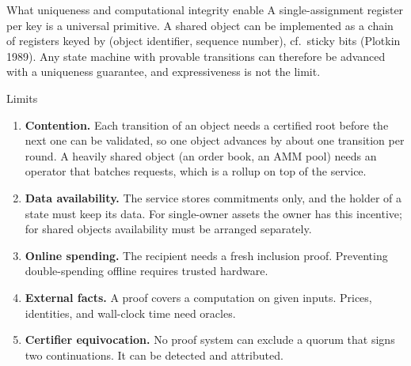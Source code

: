 \documentclass[aspectratio=169,10pt]{beamer}
\begin{document}
\begin{frame}{What uniqueness and computational integrity enable}
\footnotesize
A single-assignment register per key is a universal primitive. A shared object can be implemented as a chain of registers keyed by (object identifier, sequence number), cf.\ sticky bits (Plotkin 1989). Any state machine with provable transitions can therefore be advanced with a uniqueness guarantee, and expressiveness is not the limit.

\begin{block}{Limits}
\footnotesize
\begin{enumerate}
  \item \textbf{Contention.} Each transition of an object needs a certified root before the next one can be validated, so one object advances by about one transition per round. A heavily shared object (an order book, an AMM pool) needs an operator that batches requests, which is a rollup on top of the service.
  \item \textbf{Data availability.} The service stores commitments only, and the holder of a state must keep its data. For single-owner assets the owner has this incentive; for shared objects availability must be arranged separately.
  \item \textbf{Online spending.} The recipient needs a fresh inclusion proof. Preventing double-spending offline requires trusted hardware.
  \item \textbf{External facts.} A proof covers a computation on given inputs. Prices, identities, and wall-clock time need oracles.
  \item \textbf{Certifier equivocation.} No proof system can exclude a quorum that signs two continuations. It can be detected and attributed.
\end{enumerate}
\end{block}
\end{frame}
\end{document}
